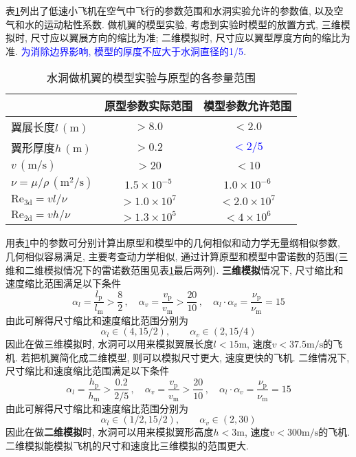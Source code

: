 \begin{solution}
\begin{enumerate}
表\ref{tab:airfoilINwater}列出了低速小飞机在空气中飞行的参数范围和水洞实验允许的参数值, 以及空气和水的运动粘性系数\cite{fluid_Properties}. 做机翼的模型实验, 考虑到实验时模型的放置方式, 三维模拟时, 尺寸应以翼展方向的缩比为准; 二维模拟时, 尺寸应以翼型厚度方向的缩比为准. \textcolor{blue}{为消除边界影响, 模型的厚度不应大于水洞直径的1/5}.

\begin{table}[!htb]\label{tab:airfoilINwater}
\centering
\caption{水洞做机翼的模型实验与原型的各参量范围}
\begin{tabular}{l|c|c}
\hline 
 & 原型参数实际范围 & 模型参数允许范围\tabularnewline
\hline 
翼展长度$l\,(\mathrm{m})$ & $>8.0$ & $<2.0$\tabularnewline
翼形厚度$h\,(\mathrm{m})$ & $>0.2$ & \textcolor{blue}{$<2/5$}\tabularnewline
\hline 
$v\,(\mathrm{m/s})$ & $>20$ & $<10$\tabularnewline
\hline 
$\nu=\mu/\rho\,(\mathrm{m^{2}/s})$ & $1.5\times 10^{-5}$ & $1.0\times 10^{-6}$\tabularnewline
\hline 
$\mathrm{Re_{3d}} = vl/\nu$ & $>1.0\times 10^7$ & $<2.0\times 10^7$\tabularnewline
$\mathrm{Re_{2d}} = vh/\nu$ & $>1.3\times 10^5$ & $<4\times 10^6$ \tabularnewline
\hline 
\end{tabular}
\end{table}

用表\ref{tab:airfoilINwater}中的参数可分别计算出原型和模型中的几何相似和动力学无量纲相似参数, 几何相似容易满足, 主要考查动力学相似, 通过计算原型和模型中雷诺数的范围(三维和二维模拟情况下的雷诺数范围见表\ref{tab:airfoilINwater}最后两列). \textbf{三维模拟}情况下, 尺寸缩比和速度缩比范围满足以下条件
\[
\alpha_l = \frac{l_\mathrm{p}}{l_\mathrm{m}} > \frac{8}{2}\, , 
\quad 
\alpha_v = \frac{v_\mathrm{p}}{v_\mathrm{m}} > \frac{20}{10}\, , 
\quad 
\alpha_l\cdot \alpha_v = \frac{\nu_\mathrm{p}}{\nu_\mathrm{m}}  = 15
\]
由此可解得尺寸缩比和速度缩比范围分别为
\[
\alpha_l \in (4, 15/2), \qquad \alpha_v \in (2, 15/4)
\]
因此在做三维模拟时, 水洞可以用来模拟翼展长度$l<15\mathrm{m}$, 速度$v<37.5\mathrm{m/s}$的飞机. 若把机翼简化成二维模型, 则可以模拟尺寸更大, 速度更快的飞机. 二维情况下, 尺寸缩比和速度缩比范围满足以下条件
\[
\alpha_l = \frac{h_\mathrm{p}}{h_\mathrm{m}} > \frac{0.2}{2/5}\, , 
\quad 
\alpha_v = \frac{v_\mathrm{p}}{v_\mathrm{m}} >\frac{20}{10}\, , 
\quad 
\alpha_l\cdot \alpha_v = \frac{\nu_\mathrm{p}}{\nu_\mathrm{m}}  = 15
\]
由此可解得尺寸缩比和速度缩比范围分别为
\[
\alpha_l \in (1/2, 15/2), \qquad \alpha_v \in (2, 30)
\]
因此在做\textbf{二维模拟}时, 水洞可以用来模拟翼形高度$h<3\mathrm{m}$, 速度$v<300\mathrm{m/s}$的飞机. 二维模拟能模拟飞机的尺寸和速度比三维模拟的范围更大.


\end{enumerate}
\end{solution}
